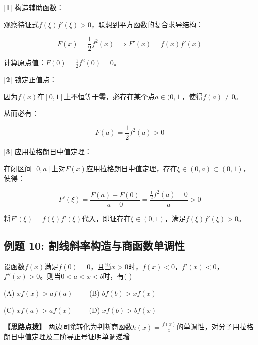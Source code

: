\documentclass[11pt,a4paper,UTF8]{ctexart}
\begin{document}
\begin{solbox}[分步推导与答题规范]
\textbf{[1]} 构造辅助函数：

观察待证式$f(\xi)f'(\xi) > 0$，联想到平方函数的复合求导结构：


\begin{equation*}
F(x) = \frac{1}{2}f^2(x) \implies F'(x) = f(x)f'(x)
\end{equation*}


计算原点值：$F(0) = \frac{1}{2}f^2(0) = 0$。

\textbf{[2]} 锁定正值点：

因为$f(x)$在$[0, 1]$上不恒等于零，必存在某个点$a \in (0, 1]$，使得$f(a) \neq 0$。

从而必有：


\begin{equation*}
F(a) = \frac{1}{2}f^2(a) > 0
\end{equation*}


\textbf{[3]} 应用拉格朗日中值定理：

在闭区间$[0, a]$上对$F(x)$应用拉格朗日中值定理，存在$\xi \in (0, a) \subset (0, 1)$，使得：


\begin{equation*}
F'(\xi) = \frac{F(a) - F(0)}{a - 0} = \frac{\frac{1}{2}f^2(a) - 0}{a} > 0
\end{equation*}


将$F'(\xi) = f(\xi)f'(\xi)$代入，即证存在$\xi \in (0, 1)$，满足$f(\xi)f'(\xi) > 0$。
\end{solbox}


\subsection{例题 10: 割线斜率构造与商函数单调性}

设函数$f(x)$满足$f(0) = 0$，且当$x > 0$时，$f(x) < 0$，$f'(x) < 0$，$f''(x) > 0$。则当$0 < a < x < b$时，有( )

(A) $xf(x) > af(a)$ $\qquad$(B) $bf(b) > xf(x)$

(C) $xf(a) > af(x)$ $\qquad$(D) $xf(b) > bf(x)$

\textbf{\color{DeepPurple}【思路点拨】} 两边同除转化为判断商函数$h(x) = \frac{f(x)}{x}$的单调性，对分子用拉格朗日中值定理及二阶导正号证明单调递增
\end{document}
